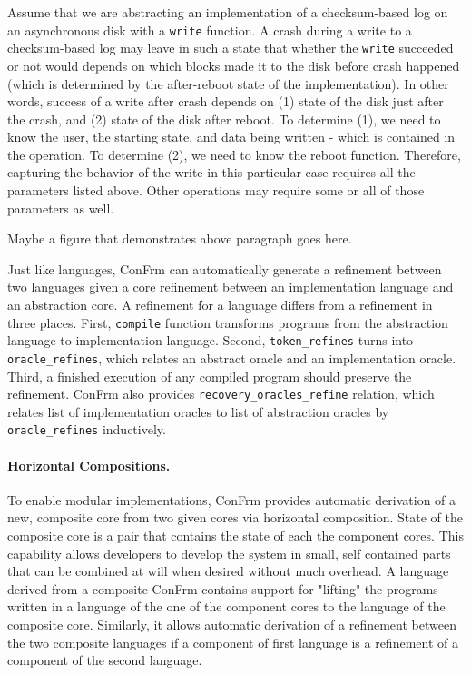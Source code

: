 Assume that we are abstracting an implementation of a checksum-based log on an asynchronous disk with a \texttt{write} function.
A crash during a write to a checksum-based log may leave in such a state that whether the \texttt{write} succeeded or not would depends on which blocks made it to the disk before crash happened (which is determined by the after-reboot state of the implementation). In other words, success of a write after crash depends on (1) state of the disk just after the crash, and (2) state of the disk after reboot. To determine (1), we need to know the user, the starting state, and data being written - which is contained in the operation. To determine (2), we need to know the reboot function. Therefore, capturing the behavior of the write in this particular case requires all the parameters listed above. Other operations may require some or all of those parameters as well.

{\color{red} Maybe a figure that demonstrates above paragraph goes here.}

Just like languages, ConFrm can automatically generate a refinement between two languages given a core refinement between an implementation language and an abstraction core. A refinement for a language differs from a refinement in three places. First, \texttt{compile} function transforms programs from the abstraction language to implementation language. Second, \texttt{token\_refines} turns into \texttt{oracle\_refines}, which relates an abstract oracle and an implementation oracle.
Third, a finished execution of any compiled program should preserve the refinement. ConFrm also provides \texttt{recovery\_oracles\_refine} relation, which relates list of implementation oracles to list of abstraction oracles by \texttt{oracle\_refines} inductively.

\paragraph{Horizontal Compositions.}
To enable modular implementations, ConFrm provides automatic derivation of a new, composite core from two given cores via horizontal composition. State of the composite core is a pair that contains the state of each the component cores. This capability allows developers to develop the system in small, self contained parts that can be combined at will when desired without much overhead. A language derived from a composite ConFrm contains support for "lifting" the programs written in a language of the one of the component cores to the language of the composite core. Similarly, it allows automatic derivation of a refinement between the two composite languages if a component of first language is a refinement of a component of the second language.

